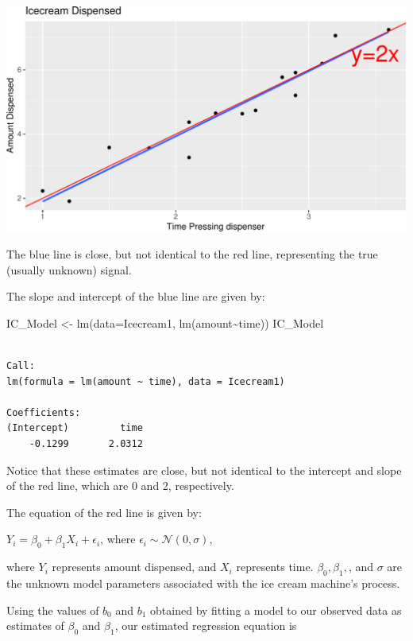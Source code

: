 \documentclass[
  letterpaper,
  DIV=11,
  numbers=noendperiod]{scrreprt}
\newenvironment{Shaded}{\begin{snugshade}}{\end{snugshade}}
\newcommand{\AttributeTok}[1]{\textcolor[rgb]{0.40,0.45,0.13}{#1}}
\newcommand{\FunctionTok}[1]{\textcolor[rgb]{0.28,0.35,0.67}{#1}}
\newcommand{\NormalTok}[1]{\textcolor[rgb]{0.00,0.23,0.31}{#1}}
\newcommand{\OtherTok}[1]{\textcolor[rgb]{0.00,0.23,0.31}{#1}}
\newcommand{\SpecialCharTok}[1]{\textcolor[rgb]{0.37,0.37,0.37}{#1}}
\begin{document}
\includegraphics{Ch4_files/figure-pdf/unnamed-chunk-12-1.pdf}

The blue line is close, but not identical to the red line, representing
the true (usually unknown) signal.

The slope and intercept of the blue line are given by:

\begin{Shaded}
\begin{Highlighting}[]
\NormalTok{IC\_Model }\OtherTok{\textless{}{-}} \FunctionTok{lm}\NormalTok{(}\AttributeTok{data=}\NormalTok{Icecream1, }\FunctionTok{lm}\NormalTok{(amount}\SpecialCharTok{\textasciitilde{}}\NormalTok{time))}
\NormalTok{IC\_Model}
\end{Highlighting}
\end{Shaded}

\begin{verbatim}

Call:
lm(formula = lm(amount ~ time), data = Icecream1)

Coefficients:
(Intercept)         time  
    -0.1299       2.0312  
\end{verbatim}

Notice that these estimates are close, but not identical to the
intercept and slope of the red line, which are 0 and 2, respectively.

The equation of the red line is given by:

\(Y_i = \beta_0 + \beta_1X_{i} + \epsilon_i\), where
\(\epsilon_i\sim\mathcal{N}(0,\sigma)\),

where \(Y_i\) represents amount dispensed, and \(X_i\) represents time.
\(\beta_0, \beta_1,\), and \(\sigma\) are the unknown model parameters
associated with the ice cream machine's process.

Using the values of \(b_0\) and \(b_1\) obtained by fitting a model to
our observed data as estimates of \(\beta_0\) and \(\beta_1\), our
estimated regression equation is
\end{document}
